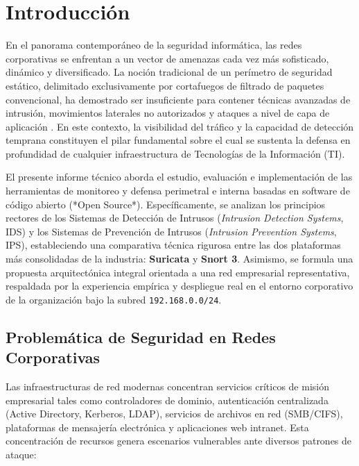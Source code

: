 
\section{Introducción}

En el panorama contemporáneo de la seguridad informática, las redes corporativas se enfrentan a un vector de amenazas cada vez más sofisticado, dinámico y diversificado. La noción tradicional de un perímetro de seguridad estático, delimitado exclusivamente por cortafuegos de filtrado de paquetes convencional, ha demostrado ser insuficiente para contener técnicas avanzadas de intrusión, movimientos laterales no autorizados y ataques a nivel de capa de aplicación \citep{rfc4732}. En este contexto, la visibilidad del tráfico y la capacidad de detección temprana constituyen el pilar fundamental sobre el cual se sustenta la defensa en profundidad de cualquier infraestructura de Tecnologías de la Información (TI).

El presente informe técnico aborda el estudio, evaluación e implementación de las herramientas de monitoreo y defensa perimetral e interna basadas en software de código abierto (*Open Source*). Específicamente, se analizan los principios rectores de los Sistemas de Detección de Intrusos (\textit{Intrusion Detection Systems}, IDS) y los Sistemas de Prevención de Intrusos (\textit{Intrusion Prevention Systems}, IPS), estableciendo una comparativa técnica rigurosa entre las dos plataformas más consolidadas de la industria: \textbf{Suricata} y \textbf{Snort 3}. Asimismo, se formula una propuesta arquitectónica integral orientada a una red empresarial representativa, respaldada por la experiencia empírica y despliegue real en el entorno corporativo de la organización bajo la subred \texttt{192.168.0.0/24}.

\subsection{Problemática de Seguridad en Redes Corporativas}

Las infraestructuras de red modernas concentran servicios críticos de misión empresarial tales como controladores de dominio, autenticación centralizada (Active Directory, Kerberos, LDAP), servicios de archivos en red (SMB/CIFS), plataformas de mensajería electrónica y aplicaciones web intranet. Esta concentración de recursos genera escenarios vulnerables ante diversos patrones de ataque:


